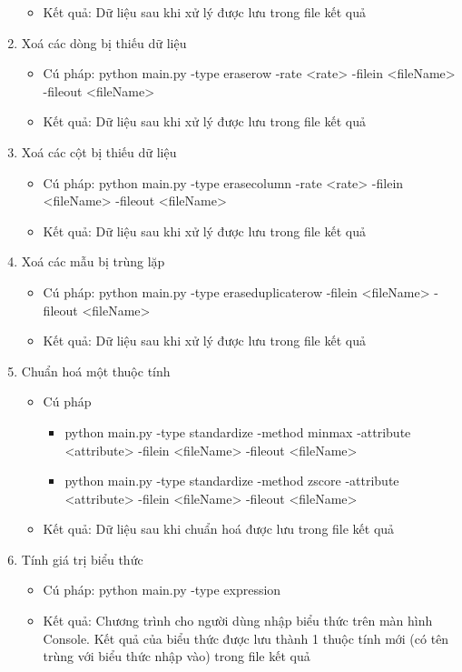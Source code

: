 \documentclass[a4paper, 12pt]{article}
\begin{document}
\begin{enumerate}
\begin{itemize}
        \item Kết quả: Dữ liệu sau khi xử lý được lưu trong file kết quả
    \end{itemize}

    \item Xoá các dòng bị thiếu dữ liệu
    \begin{itemize}
        \item Cú pháp: python main.py -type eraserow -rate <rate> -filein <fileName> -fileout <fileName>
        \item Kết quả: Dữ liệu sau khi xử lý được lưu trong file kết quả
    \end{itemize}

    \item Xoá các cột bị thiếu dữ liệu
    \begin{itemize}
        \item Cú pháp: python main.py -type erasecolumn -rate <rate> -filein <fileName> -fileout <fileName>
        \item Kết quả: Dữ liệu sau khi xử lý được lưu trong file kết quả
    \end{itemize}

    \item Xoá các mẫu bị trùng lặp
    \begin{itemize}
        \item Cú pháp: python main.py -type eraseduplicaterow -filein <fileName> -fileout <fileName>
        \item Kết quả: Dữ liệu sau khi xử lý được lưu trong file kết quả
    \end{itemize}

    \item Chuẩn hoá một thuộc tính
    \begin{itemize}
        \item Cú pháp
        \begin{itemize}
            \item python main.py -type standardize -method minmax -attribute <attribute> -filein <fileName> -fileout <fileName>
            \item python main.py -type standardize -method zscore -attribute <attribute> -filein <fileName> -fileout <fileName>
        \end{itemize}

        \item Kết quả: Dữ liệu sau khi chuẩn hoá được lưu trong file kết quả
    \end{itemize}

    \item Tính giá trị biểu thức
    \begin{itemize}
        \item Cú pháp: python main.py -type expression
        \item Kết quả: Chương trình cho người dùng nhập biểu thức trên màn hình Console. Kết quả của biểu thức được lưu thành 1 thuộc tính mới (có tên trùng với biểu thức nhập vào) trong file kết quả
    \end{itemize}

\end{enumerate}
\end{document}

